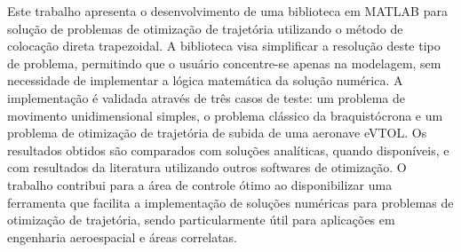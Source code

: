 Este trabalho apresenta o desenvolvimento de uma biblioteca em MATLAB para solução de problemas de otimização de trajetória utilizando o método de colocação direta trapezoidal. A biblioteca visa simplificar a resolução deste tipo de problema, permitindo que o usuário concentre-se apenas na modelagem, sem necessidade de implementar a lógica matemática da solução numérica. A implementação é validada através de três casos de teste: um problema de movimento unidimensional simples, o problema clássico da braquistócrona e um problema de otimização de trajetória de subida de uma aeronave eVTOL. Os resultados obtidos são comparados com soluções analíticas, quando disponíveis, e com resultados da literatura utilizando outros softwares de otimização. O trabalho contribui para a área de controle ótimo ao disponibilizar uma ferramenta que facilita a implementação de soluções numéricas para problemas de otimização de trajetória, sendo particularmente útil para aplicações em engenharia aeroespacial e áreas correlatas.